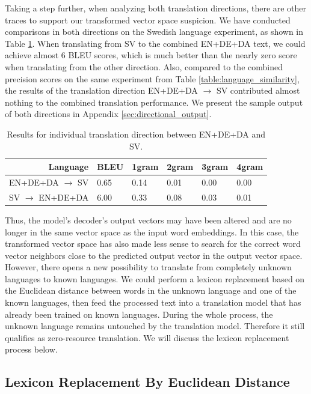 \documentclass[thesis,fonts=libertine]{cluu}
\begin{document}
Taking a step further, when analyzing both translation directions, there are other traces to support our transformed vector space suspicion. We have conducted comparisons in both directions on the Swedish language experiment, as shown in Table \ref{table:directional_results}. When translating from SV to the combined EN+DE+DA text, we could achieve almost 6 BLEU scores, which is much better than the nearly zero score when translating from the other direction. Also, compared to the combined precision scores on the same experiment from Table \ref{table:language_similarity}, the results of the translation direction EN+DE+DA $\rightarrow$ SV contributed almost nothing to the combined translation performance. We present the sample output of both directions in Appendix \ref{sec:directional_output}.

\begin{table}
  \centering
  \begin{tabular}{r|*{5}{l}}
    \hline
    \textbf{Language} & \textbf{BLEU} & \textbf{1gram} & \textbf{2gram} & \textbf{3gram} & \textbf{4gram} \\ [0.25ex]
    \hline\hline
    EN+DE+DA $\rightarrow$ SV & 0.65 & 0.14 & 0.01 & 0.00 & 0.00 \\
    SV $\rightarrow$ EN+DE+DA & 6.00 & 0.33 & 0.08 & 0.03 & 0.01 \\
    \hline
  \end{tabular}
  \caption{Results for individual translation direction between EN+DE+DA and SV.}
  \label{table:directional_results}
\end{table}

Thus, the model's decoder's output vectors may have been altered and are no longer in the same vector space as the input word embeddings. In this case, the transformed vector space has also made less sense to search for the correct word vector neighbors close to the predicted output vector in the output vector space. However, there opens a new possibility to translate from completely unknown languages to known languages. We could perform a lexicon replacement based on the Euclidean distance between words in the unknown language and one of the known languages, then feed the processed text into a translation model that has already been trained on known languages. During the whole process, the unknown language remains untouched by the translation model. Therefore it still qualifies as zero-resource translation. We will discuss the lexicon replacement process below.

\subsection{Lexicon Replacement By Euclidean Distance}
\end{document}
